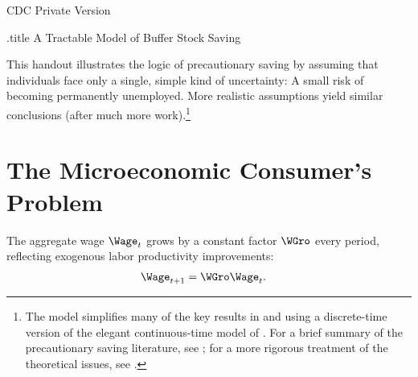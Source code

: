\documentclass{\handout}
\begin{document}
\begin{CDCPrivate}
\centerline{CDC Private Version}                                %
\end{CDCPrivate}


\providecommand{\dmEqZero}{\ensuremath{\Delta\mRatE=0}}
\providecommand{\dcEqZero}{\ensuremath{\Delta\cRatE=0}}

\begin{verbatimwrite}{\jobname.title}
A Tractable Model of Buffer Stock Saving
\end{verbatimwrite}



This handout illustrates the logic of precautionary saving by assuming that individuals face only a single, simple kind of uncertainty: A small risk of becoming permanently unemployed.  More realistic assumptions yield similar conclusions (after much more work).\footnote{The model simplifies many of the key results in \cite{carroll:brookings} and \cite{carrollBSLCPIH} using a discrete-time version of the elegant continuous-time model of \cite{toche:urisk}.  For a brief summary of the precautionary saving literature, see \cite{CarrollKimballPSPW}; for a more rigorous treatment of the theoretical issues, see \cite{BufferStockTheory}.}

\section{The Microeconomic Consumer's Problem}
The aggregate wage $\Wage_{t}$ grows by a constant factor $\WGro$ every period, reflecting exogenous labor productivity improvements:
\begin{equation}\begin{gathered}\begin{aligned}
        \Wage_{t+1} & =  \WGro \Wage_{t}.
\end{aligned}\end{gathered}\end{equation}
\end{document}
